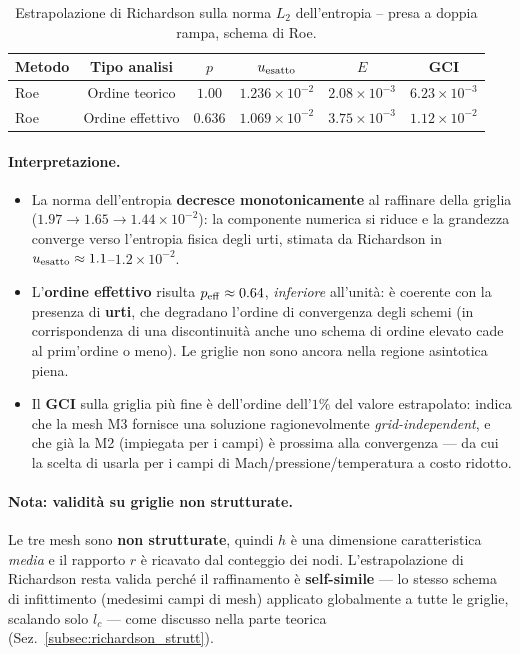 \begin{table}[H]
  \centering
  \caption{Estrapolazione di Richardson sulla norma $L_2$ dell'entropia -- presa a doppia rampa,
           schema di Roe.}
  \label{tab:presa_convergenza}
  \renewcommand{\arraystretch}{1.3}
  \begin{tabular}{lccccc}
    \toprule
    Metodo & Tipo analisi & $p$ & $u_{\rm esatto}$ & $E$ & GCI \\
    \midrule
    Roe & Ordine teorico   & $1.00$  & $1.236\times10^{-2}$ & $2.08\times10^{-3}$ & $6.23\times10^{-3}$ \\
    Roe & Ordine effettivo & $0.636$ & $1.069\times10^{-2}$ & $3.75\times10^{-3}$ & $1.12\times10^{-2}$ \\
    \bottomrule
  \end{tabular}
\end{table}

\paragraph{Interpretazione.}
\begin{itemize}
  \item La norma dell'entropia \textbf{decresce monotonicamente} al raffinare della griglia
    ($1.97 \to 1.65 \to 1.44 \times 10^{-2}$): la componente numerica si riduce e la grandezza
    converge verso l'entropia fisica degli urti, stimata da Richardson in
    $u_{\rm esatto}\approx1.1$--$1.2\times10^{-2}$.
  \item L'\textbf{ordine effettivo} risulta $p_{\rm eff}\approx0.64$, \emph{inferiore} all'unità:
    è coerente con la presenza di \textbf{urti}, che degradano l'ordine di convergenza degli schemi
    (in corrispondenza di una discontinuità anche uno schema di ordine elevato cade al prim'ordine
    o meno). Le griglie non sono ancora nella regione asintotica piena.
  \item Il \textbf{GCI} sulla griglia più fine è dell'ordine dell'$1\%$ del valore estrapolato:
    indica che la mesh M3 fornisce una soluzione ragionevolmente \emph{grid-independent}, e che già
    la M2 (impiegata per i campi) è prossima alla convergenza --- da cui la scelta di usarla per i
    campi di Mach/pressione/temperatura a costo ridotto.
\end{itemize}

\paragraph{Nota: validità su griglie non strutturate.}
Le tre mesh sono \textbf{non strutturate}, quindi $h$ è una dimensione caratteristica \emph{media} e
il rapporto $r$ è ricavato dal conteggio dei nodi. L'estrapolazione di Richardson resta valida
perché il raffinamento è \textbf{self-simile} --- lo stesso schema di infittimento (medesimi campi
di mesh) applicato globalmente a tutte le griglie, scalando solo $l_c$ --- come discusso nella parte
teorica (Sez.~\ref{subsec:richardson_strutt}).

